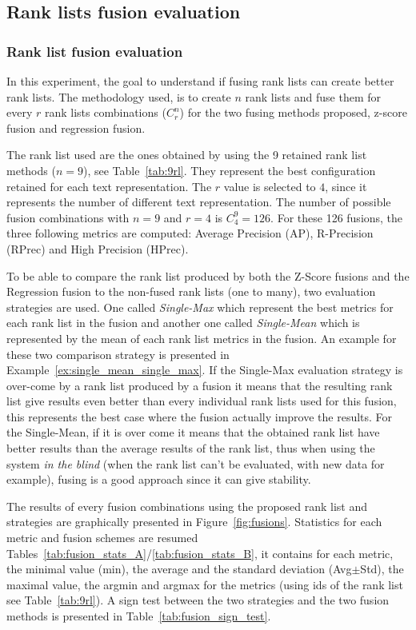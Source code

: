 \subsection{Rank lists fusion evaluation}

\subsubsection{Rank list fusion evaluation \label{sec:eval_fusion}}

In this experiment, the goal to understand if fusing rank lists can create better rank lists.
The methodology used, is to create $n$ rank lists and fuse them for every $r$ rank lists combinations ($C^n_r$) for the two fusing methods proposed, z-score fusion and regression fusion.

The rank list used are the ones obtained by using the 9 retained rank list methods ($n=9$), see Table~\ref{tab:9rl}.
They represent the best configuration retained for each text representation.
The $r$ value is selected to $4$, since it represents the number of different text representation.
The number of possible fusion combinations with $n=9$ and $r=4$ is $C^{9}_{4} = 126$.
For these 126 fusions, the three following metrics are computed: Average Precision (AP), R-Precision (RPrec) and High Precision (HPrec).

To be able to compare the rank list produced by both the Z-Score fusions and the Regression fusion to the non-fused rank lists (one to many), two evaluation strategies are used.
One called \textit{Single-Max} which represent the best metrics for each rank list in the fusion and another one called \textit{Single-Mean} which is represented by the mean of each rank list metrics in the fusion.
An example for these two comparison strategy is presented in Example~\ref{ex:single_mean_single_max}.
If the Single-Max evaluation strategy is over-come by a rank list produced by a fusion it means that the resulting rank list give results even better than every individual rank lists used for this fusion, this represents the best case where the fusion actually improve the results.
For the Single-Mean, if it is over come it means that the obtained rank list have better results than the average results of the rank list, thus when using the system \textit{in the blind} (when the rank list can't be evaluated, with new data for example), fusing is a good approach since it can give stability.

The results of every fusion combinations using the proposed rank list and strategies are graphically presented in Figure~\ref{fig:fusions}.
Statistics for each metric and fusion schemes are resumed Tables~\ref{tab:fusion_stats_A}/\ref{tab:fusion_stats_B}, it contains for each metric, the minimal value (min), the average and the standard deviation (Avg$\pm$Std), the maximal value, the argmin and argmax for the metrics (using ids of the rank list see Table~\ref{tab:9rl}).
A sign test between the two strategies and the two fusion methods is presented in Table~\ref{tab:fusion_sign_test}.

